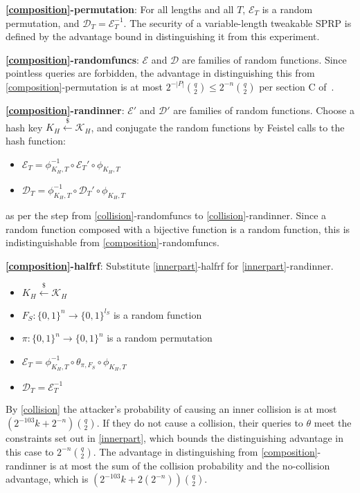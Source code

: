 \documentclass[letterpaper,luatex,11pt]{article}
\newcommand*{\xprm}[2]{\textsf{\ref*{#1}-#2}}
\newcommand*{\xprmtitle}[2]{\textbf{\xprm{#1}{#2}}}
\newcommand*{\calE}{\mathcal{E}}
\newcommand*{\calD}{\mathcal{D}}
\begin{document}
\xprmtitle{composition}{permutation}: For all lengths and all $T$, $\calE_T$ is a random permutation,
and $\calD_T = \calE_T^{-1}$. The security of a variable-length tweakable SPRP is defined by
the advantage bound in distinguishing it from this experiment.

\xprmtitle{composition}{randomfuncs}: $\calE$ and $\calD$ are
families of random functions.
Since pointless queries are forbidden, the advantage in distinguishing this from
\xprm{composition}{permutation} is at most $2^{-|P|}\binom{q}{2} \leq 2^{-n}\binom{q}{2}$
per section C of~\cite{cmc}.

\xprmtitle{composition}{randinner}: $\calE'$ and $\calD'$ are families of random functions.
Choose a hash key $K_H \xleftarrow{\$} \mathcal{K}_H$,
and conjugate the random functions by Feistel calls to the hash function:

\begin{itemize}
    \item $\calE_T = \phi^{-1}_{K_H, T} \circ \calE_T' \circ \phi_{K_H, T}$
    \item $\calD_T = \phi^{-1}_{K_H, T} \circ \calD_T' \circ \phi_{K_H, T}$
\end{itemize}

as per the step from \xprm{collision}{randomfuncs}
to \xprm{collision}{randinner}.
Since a random function composed with a bijective function is a random function,
this is indistinguishable from \xprm{composition}{randomfuncs}.

\xprmtitle{composition}{halfrf}: Substitute \xprm{innerpart}{halfrf} for \xprm{innerpart}{randinner}.
\begin{itemize}
    \item $K_H \xleftarrow{\$} \mathcal{K}_H$
    \item $F_S: \{0,1\}^n \rightarrow \{0,1\}^{l_S}$ is a random function
    \item $\pi: \{0,1\}^n \rightarrow \{0,1\}^n$ is a random permutation
    \item $\calE_T = \phi^{-1}_{K_H, T} \circ \theta_{\pi, F_S} \circ \phi_{K_H, T}$
    \item $\calD_T = \calE_T^{-1}$
\end{itemize}

By \autoref{collision} the attacker's probability of causing an inner collision is at most
$(2^{-103}k + 2^{-n})\binom{q}{2}$. If they do not cause a collision,
their queries to $\theta$ meet the constraints set out in \autoref{innerpart}, which
bounds the distinguishing advantage in this case to $2^{-n}\binom{q}{2}$.
The advantage in distinguishing from \xprm{composition}{randinner}
is at most the sum of the collision probability and the no-collision advantage, which is
$(2^{-103}k + 2(2^{-n}))\binom{q}{2}$.
\end{document}
